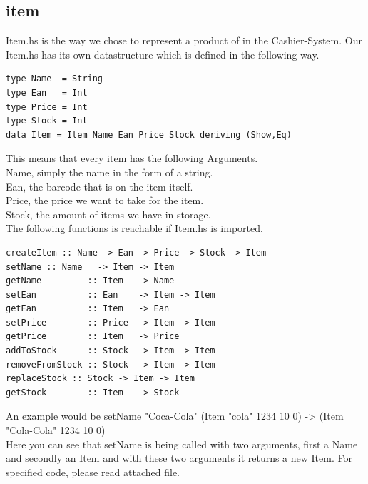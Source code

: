 \documentclass[11pt]{article}
\begin{document}
\subsection{item}
Item.hs is the way we chose to represent a product of in the Cashier-System. Our Item.hs has its own datastructure which is defined in the following way.
\begin{lstlisting}
type Name  = String
type Ean   = Int
type Price = Int
type Stock = Int
data Item = Item Name Ean Price Stock deriving (Show,Eq)
\end{lstlisting}
This means that every item has the following Arguments.\\
Name, simply the name in the form of a string.\\
Ean, the barcode that is on the item itself.\\
Price, the price we want to take for the item.\\
Stock, the amount of items we have in storage.\\
The following functions is reachable if Item.hs is imported.\\
\begin{lstlisting}
createItem :: Name -> Ean -> Price -> Stock -> Item
setName :: Name   -> Item -> Item
getName         :: Item   -> Name
setEan          :: Ean    -> Item -> Item
getEan          :: Item   -> Ean
setPrice        :: Price  -> Item -> Item
getPrice        :: Item   -> Price
addToStock      :: Stock  -> Item -> Item
removeFromStock :: Stock  -> Item -> Item
replaceStock :: Stock -> Item -> Item
getStock        :: Item   -> Stock
\end{lstlisting}
An example would be setName "Coca-Cola" (Item "cola" 1234 10 0) -> (Item "Cola-Cola" 1234 10 0)\\
Here you can see that setName is being called with two arguments, first a Name and secondly an Item and with these two arguments it returns a new Item. For specified code, please read attached file.
\end{document}
